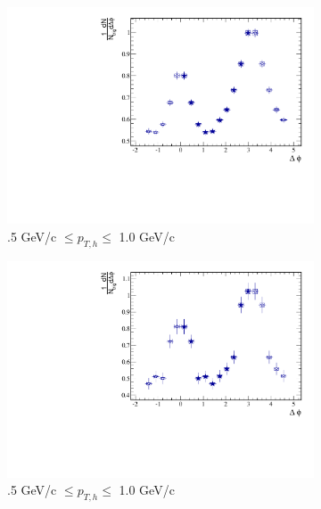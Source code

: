 \begin{figure}[htbp]
	\begin{subfigure}{0.5\textwidth}
		\includegraphics[width=\textwidth]{Plots/Correlations/pp/pp_NPE_h_corr_primpt_4_5_assopt_1_1.pdf}
		\caption{.5 GeV/c $\leq p_{T,h} \leq$ 1.0 GeV/c}
		\label{fig:ppcorra}
	\end{subfigure}	
	\begin{subfigure}{0.5\textwidth}
		\includegraphics[width=\textwidth]{Plots/Correlations/pp/pp_NPE_h_corr_primpt_6_8_assopt_1_1.pdf}
		\caption{.5 GeV/c $\leq p_{T,h} \leq$ 1.0 GeV/c}
		\label{fig:ppcorrb}
	\end{subfigure}	
	\begin{subfigure}{0.5\textwidth}

\end{subfigure}
\end{figure}

